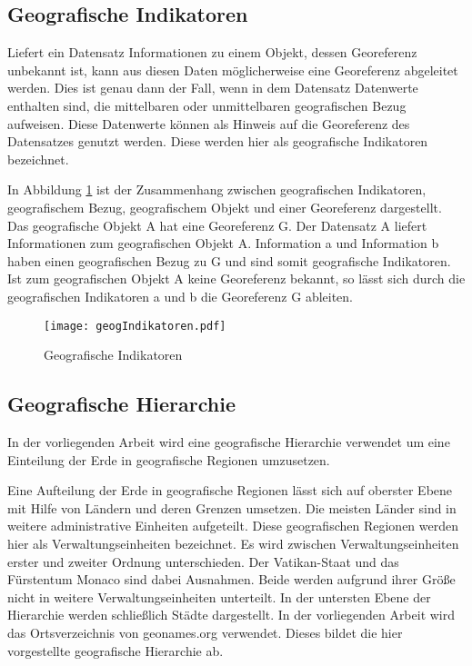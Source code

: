 		\subsection{Geografische Indikatoren}

			Liefert ein Datensatz Informationen zu einem Objekt, dessen Georeferenz unbekannt ist, kann aus diesen Daten möglicherweise eine Georeferenz abgeleitet werden. 
			Dies ist genau dann der Fall, wenn in dem Datensatz Datenwerte enthalten sind, die mittelbaren oder unmittelbaren geografischen Bezug aufweisen.
			Diese Datenwerte können als Hinweis auf die Georeferenz des Datensatzes genutzt werden.
			Diese werden hier als geografische Indikatoren bezeichnet.

			In Abbildung \ref{img:geogIndi} ist der Zusammenhang zwischen geografischen Indikatoren, geografischem Bezug, geografischem Objekt und einer Georeferenz dargestellt. 
			Das geografische Objekt A hat eine Georeferenz G.
			Der Datensatz A liefert Informationen zum geografischen Objekt A.
			Information a und Information b haben einen geografischen Bezug zu G und sind somit geografische Indikatoren.
			Ist zum geografischen Objekt A keine Georeferenz bekannt, so lässt sich durch die geografischen Indikatoren a und b die Georeferenz G ableiten. 

			\begin{figure}[h!]
			\begin{center}
				\texttt{[image: geogIndikatoren.pdf]}
				\caption{Geografische Indikatoren}
				\label{img:geogIndi}
			\end{center}
			\end{figure}	

		\subsection{Geografische Hierarchie} \label{sub:geografischeHierarchie} 
			
			In der vorliegenden Arbeit wird eine geografische Hierarchie verwendet um eine Einteilung der Erde in geografische Regionen umzusetzen.

			Eine Aufteilung der Erde in geografische Regionen lässt sich auf oberster Ebene mit Hilfe von Ländern und deren Grenzen umsetzen. 
			Die meisten Länder sind in weitere administrative Einheiten aufgeteilt.
			Diese geografischen Regionen werden hier als Verwaltungseinheiten bezeichnet.
			Es wird zwischen Verwaltungseinheiten erster und zweiter Ordnung unterschieden. 
			Der Vatikan-Staat und das Fürstentum Monaco sind dabei Ausnahmen.
			Beide werden aufgrund ihrer Größe nicht in weitere Verwaltungseinheiten unterteilt.
			In der untersten Ebene der Hierarchie werden schließlich Städte dargestellt.
			In der vorliegenden Arbeit wird das Ortsverzeichnis von geonames.org verwendet. 
			Dieses bildet die hier vorgestellte geografische Hierarchie ab.


